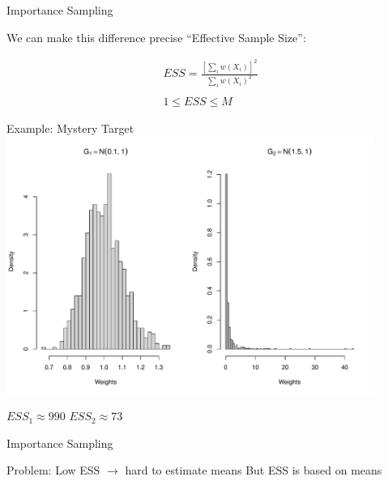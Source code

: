 \documentclass[14pt]{beamer}
\newcommand{\bE}{\mathbb{E}}
\begin{document}
\begin{frame}{Importance Sampling}
    \begin{outline}
        \1 We can make this difference precise
        \1 ``Effective Sample Size'':
    \end{outline}
    \begin{gather*}
        ESS = \frac{\left[\sum_i w(X_i)\right]^2}{\sum_i w(X_i)^2}\\ \\
        1 \leq ESS \leq M
    \end{gather*}
\end{frame}

\begin{frame}{Example: Mystery Target}
    \centering
    \includegraphics[height=0.7\textheight, width=0.9\textwidth, keepaspectratio]{Figures/Wt Hist.pdf} \newline
    \begin{outline}
        $ESS_1 \approx 990$ \hspace{2.5cm} $ESS_2 \approx 73$
    \end{outline}
\end{frame}

\begin{frame}{Importance Sampling}
    \begin{outline}
        \1 Problem: Low ESS $\rightarrow$ hard to estimate means \newline
        \1 But ESS is based on means
            \2 \citep{Cha18}
    \end{outline}
\end{frame}

\end{document}
